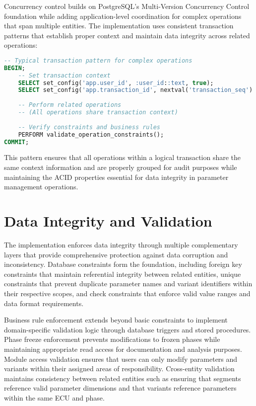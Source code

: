 Concurrency control builds on PostgreSQL's Multi-Version Concurrency Control foundation while adding application-level coordination for complex operations that span multiple entities. The implementation uses consistent transaction patterns that establish proper context and maintain data integrity across related operations:

\begin{lstlisting}[language=SQL, caption={Transaction Management Pattern}, label={lst:transaction-management}]
-- Typical transaction pattern for complex operations
BEGIN;
    -- Set transaction context
    SELECT set_config('app.user_id', :user_id::text, true);
    SELECT set_config('app.transaction_id', nextval('transaction_seq')::text, true);
    
    -- Perform related operations
    -- (All operations share transaction context)
    
    -- Verify constraints and business rules
    PERFORM validate_operation_constraints();
COMMIT;
\end{lstlisting}

This pattern ensures that all operations within a logical transaction share the same context information and are properly grouped for audit purposes while maintaining the ACID properties essential for data integrity in parameter management operations.

\section{Data Integrity and Validation}
\label{sec:data-integrity-validation}

The implementation enforces data integrity through multiple complementary layers that provide comprehensive protection against data corruption and inconsistency. Database constraints form the foundation, including foreign key constraints that maintain referential integrity between related entities, unique constraints that prevent duplicate parameter names and variant identifiers within their respective scopes, and check constraints that enforce valid value ranges and data format requirements.

Business rule enforcement extends beyond basic constraints to implement domain-specific validation logic through database triggers and stored procedures. Phase freeze enforcement prevents modifications to frozen phases while maintaining appropriate read access for documentation and analysis purposes. Module access validation ensures that users can only modify parameters and variants within their assigned areas of responsibility. Cross-entity validation maintains consistency between related entities such as ensuring that segments reference valid parameter dimensions and that variants reference parameters within the same ECU and phase.

